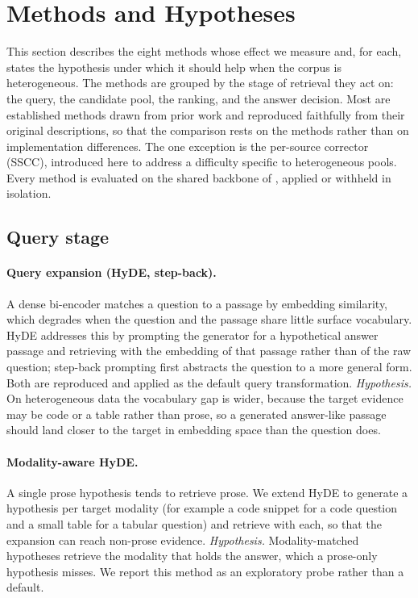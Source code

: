 \documentclass[10pt,twocolumn]{article}
\begin{document}
\section{Methods and Hypotheses}\label{sec:methods}
This section describes the eight methods whose effect we measure and, for each,
states the hypothesis under which it should help when the corpus is
heterogeneous. The methods are grouped by the stage of retrieval they act on: the
query, the candidate pool, the ranking, and the answer decision. Most are
established methods drawn from prior work and reproduced faithfully from their
original descriptions, so that the comparison rests on the methods rather than on
implementation differences. The one exception is the per-source corrector (SSCC),
introduced here to address a difficulty specific to heterogeneous pools. Every
method is evaluated on the shared backbone of , applied or
withheld in isolation.

\subsection{Query stage}
\paragraph{Query expansion (HyDE, step-back).}
A dense bi-encoder matches a question to a passage by embedding similarity, which
degrades when the question and the passage share little surface vocabulary. HyDE
\cite{gao2023hyde} addresses this by prompting the generator for a hypothetical
answer passage and retrieving with the embedding of that passage rather than of
the raw question; step-back prompting \cite{zheng2024stepback,wang2023query2doc}
first abstracts the question to a more general form. Both are reproduced and
applied as the default query transformation.
\emph{Hypothesis.} On heterogeneous data the vocabulary gap is wider, because the
target evidence may be code or a table rather than prose, so a generated
answer-like passage should land closer to the target in embedding space than the
question does.

\paragraph{Modality-aware HyDE.}
A single prose hypothesis tends to retrieve prose. We extend HyDE to generate a
hypothesis per target modality (for example a code snippet for a code question
and a small table for a tabular question) and retrieve with each, so that the
expansion can reach non-prose evidence.
\emph{Hypothesis.} Modality-matched hypotheses retrieve the modality that holds
the answer, which a prose-only hypothesis misses. We report this method as an
exploratory probe rather than a default.
\end{document}
